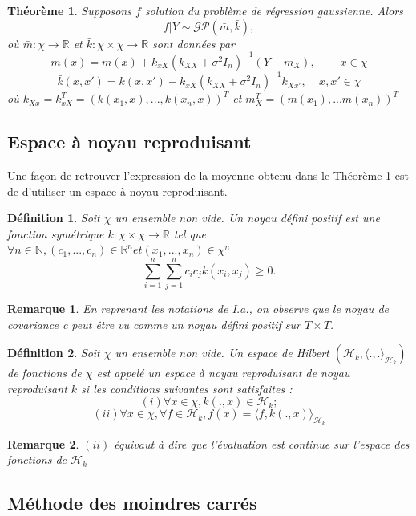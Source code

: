 \documentclass[a4paper,12pt]{article}
\newtheorem{definition}{Définition}
\newtheorem{theorem}{Théorème}
\newtheorem{remark}{Remarque}
\begin{document}
\begin{theorem}
    Supposons $f$ solution du problème de régression gaussienne. Alors
$$ f|Y\sim\mathcal{GP}(\bar{m},\bar{k}),
$$
où $\bar{m}:\chi\to\mathbb{R}$ et $\bar{k}:\chi\times\chi\to\mathbb{R}$ sont données par
$$ \bar{m}(x)=m(x)+k_{xX}(k_{XX}+\sigma^2I_n)^{-1}(Y-m_X),~~~~~~~~~~x\in\chi $$
$$ \bar{k}(x,x')=k(x,x')-k_{xX}(k_{XX}+\sigma^2I_n)^{-1}k_{Xx'}, ~~~~~ x, x'\in\chi$$
où $k_{Xx}=k_{xX}^{T}=(k(x_1,x),...,k(x_n,x))^{T}$ et $m_X^{T}=(m(x_1),...m(x_n))^{T}$
\end{theorem}

\subsection{Espace à noyau reproduisant}

Une façon de retrouver l'expression de la moyenne obtenu dans le Théorème 1 est
de d'utiliser un espace à noyau reproduisant.

\begin{definition}
    Soit $\chi$ un ensemble non vide. Un noyau défini positif est une fonction symétrique $k : \chi \times \chi \to \mathbb{R}$ tel que $\forall n \in \mathbb{N}, (c_1,...,c_n) \in \mathbb{R}^n et (x_1,...,x_n) \in \chi^n$
$$
\sum_{i=1}^n \sum_{j=1}^n c_i c_j k(x_i,x_j) \ge 0.
$$
\end{definition}

\begin{remark}
    En reprenant les notations de I.a., on observe que le noyau de covariance c peut 
    être vu comme un noyau défini positif sur $T \times T$. 
\end{remark}

\begin{definition}
    Soit $\chi$ un ensemble non vide. Un espace de Hilbert $(\mathcal{H}_k,\langle .,.\rangle_{\mathcal{H}_k})$ de fonctions de $\chi$ est appelé un espace à noyau reproduisant de noyau reproduisant $k$ si les conditions suivantes sont satisfaites :
$$
(i) \forall x\in\chi, k(.,x)\in\mathcal{H}_k;
$$
$$
(ii) \forall x\in\chi,\forall f\in\mathcal{H}_k,f(x)=\langle f,k(.,x)\rangle_{\mathcal{H}_k}
$$
\end{definition}

\begin{remark}
    $(ii)$ équivaut à dire que l'évaluation est continue sur l'espace des fonctions de $\mathcal{H}_k$
\end{remark}

\subsection{Méthode des moindres carrés}
\end{document}
